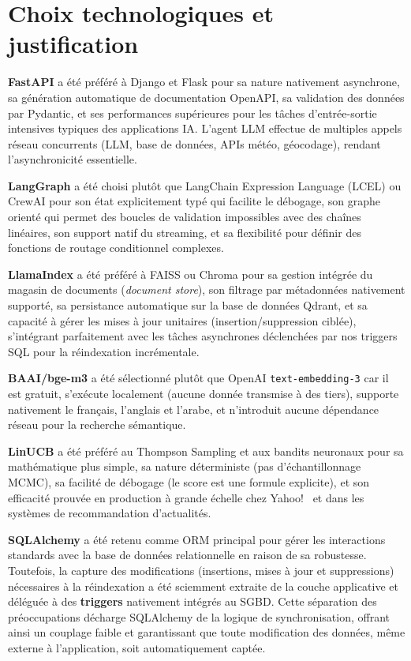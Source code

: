 \section{Choix technologiques et justification}

\textbf{FastAPI} a été préféré à Django et Flask pour sa nature nativement asynchrone, sa
génération automatique de documentation OpenAPI, sa validation des données par Pydantic, et ses
performances supérieures pour les tâches d'entrée-sortie intensives typiques des applications IA.
L'agent LLM effectue de multiples appels réseau concurrents (LLM, base de données, APIs
météo, géocodage), rendant l'asynchronicité essentielle.

\textbf{LangGraph} a été choisi plutôt que LangChain Expression Language (LCEL) ou CrewAI pour
son état explicitement typé qui facilite le débogage, son graphe orienté qui permet des boucles
de validation impossibles avec des chaînes linéaires, son support natif du streaming, et sa
flexibilité pour définir des fonctions de routage conditionnel complexes.

\textbf{LlamaIndex} a été préféré à FAISS ou Chroma pour sa gestion intégrée du magasin de
documents (\textit{document store}), son filtrage par métadonnées nativement supporté, sa
persistance automatique sur la base de données Qdrant, et sa capacité à gérer les mises à jour 
unitaires (insertion/suppression ciblée), s'intégrant parfaitement avec les tâches asynchrones 
déclenchées par nos triggers SQL pour la réindexation incrémentale.

\textbf{BAAI/bge-m3} a été sélectionné plutôt que OpenAI \texttt{text-embedding-3} car il est
gratuit, s'exécute localement (aucune donnée transmise à des tiers), supporte nativement le
français, l'anglais et l'arabe, et n'introduit aucune dépendance réseau pour la recherche
sémantique.

\textbf{LinUCB} a été préféré au Thompson Sampling et aux bandits neuronaux pour sa mathématique
plus simple, sa nature déterministe (pas d'échantillonnage MCMC), sa facilité de débogage
(le score est une formule explicite), et son efficacité prouvée en production à grande échelle
chez Yahoo!~\cite{li2010linucb} et dans les systèmes de recommandation d'actualités.

\textbf{SQLAlchemy} a été retenu comme ORM principal pour gérer les interactions standards 
avec la base de données relationnelle en raison de sa robustesse. Toutefois, la capture 
des modifications (insertions, mises à jour et suppressions) nécessaires à la réindexation 
a été sciemment extraite de la couche applicative et déléguée à des \textbf{triggers} 
nativement intégrés au SGBD. Cette séparation des préoccupations décharge SQLAlchemy 
de la logique de synchronisation, offrant ainsi un couplage faible et garantissant que 
toute modification des données, même externe à l'application, soit automatiquement captée.

